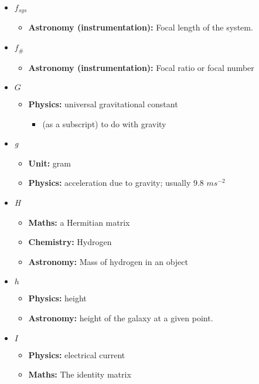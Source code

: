 \begin{itemize}
				\item $f_{sys}$
				\begin{itemize}
					\item\textbf{Astronomy (instrumentation):} Focal length of the system.
				\end{itemize}
				
				\item $f_\#$
				\begin{itemize}
					\item\textbf{Astronomy (instrumentation):} Focal ratio or focal number
				\end{itemize}
				
				\item $G$
				\begin{itemize}
					\item\textbf{Physics:} universal gravitational constant
					\begin{itemize}
						\item (as a subscript) to do with gravity
					\end{itemize}
				\end{itemize}
				
				\item \textit{g}
				\begin{itemize}
					\item\textbf{Unit:} gram
					\item\textbf{Physics:} acceleration due to gravity; usually 9.8 $ms^{-2}$
				\end{itemize}
				
				\item \textit{H}
				\begin{itemize}
					\item\textbf{Maths:} a Hermitian matrix
					\item\textbf{Chemistry:} Hydrogen
					\item\textbf{Astronomy:} Mass of hydrogen in an object
				\end{itemize}
				
				\item $h$
				\begin{itemize}
					\item\textbf{Physics:} height
					\item\textbf{Astronomy:} height of the galaxy at a given point.
				\end{itemize}
				
				\item $I$
				\begin{itemize}
					\item\textbf{Physics:} electrical current
					\item\textbf{Maths:} The identity matrix
				\end{itemize}
				

\end{itemize}
